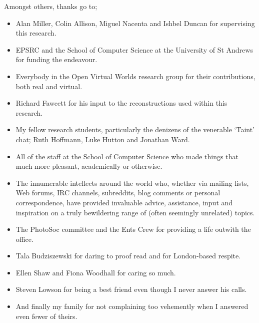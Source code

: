 Amongst others, thanks go to;

\begin{itemize}

	\item Alan Miller, Colin Allison, Miguel Nacenta and Ishbel Duncan for supervising this research.
	
	\item EPSRC and the School of Computer Science at the University of St Andrews for funding the endeavour.
	
	\item Everybody in the Open Virtual Worlds research group for their contributions, both real and virtual.
	
	\item Richard Fawcett for his input to the reconstructions used within this research.
	
	\item My fellow research students, particularly the denizens of the venerable `Taint' chat; Ruth Hoffmann, Luke Hutton and Jonathan Ward.
	
	\item All of the staff at the School of Computer Science who made things that much more pleasant, academically or otherwise.
	
	\item The innumerable intellects around the world who, whether via mailing lists, Web forums, IRC channels, subreddits, blog comments or personal correspondence, have provided invaluable advice, assistance, input and inspiration on a truly bewildering range of (often seemingly unrelated) topics.
	
	\item The PhotoSoc committee and the Ents Crew for providing a life outwith the office.
	
	\item Tala Budziszewski for daring to proof read and for London-based respite.
	
	\item Ellen Shaw and Fiona Woodhall for caring so much.
	
	\item Steven Lowson for being a best friend even though I never answer his calls.
	
	\item And finally my family for not complaining too vehemently when I answered even fewer of theirs.

\end{itemize}
